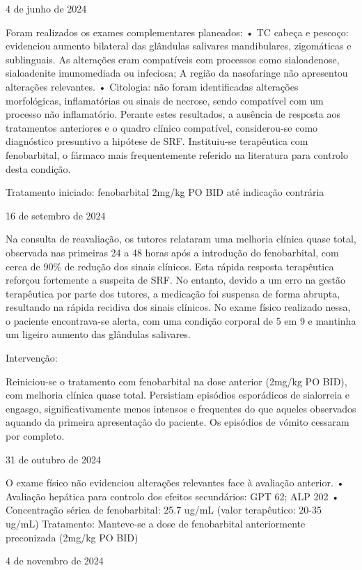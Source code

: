 4 de junho de 2024


Foram realizados os exames complementares planeados:
•	TC cabeça e pescoço: evidenciou aumento bilateral das glândulas salivares mandibulares, zigomáticas e sublinguais. As alterações eram compatíveis com processos como sialoadenose, sialoadenite imunomediada ou infeciosa; A região da nasofaringe não apresentou alterações relevantes.
•	Citologia: não foram identificadas alterações morfológicas, inflamatórias ou sinais de necrose, sendo compatível com um processo não inflamatório.
Perante estes resultados, a ausência de resposta aos tratamentos anteriores e o quadro clínico compatível, considerou-se como diagnóstico presuntivo a hipótese de SRF. Instituiu-se terapêutica com fenobarbital, o fármaco mais frequentemente referido na literatura para controlo desta condição.


Tratamento iniciado: fenobarbital 2mg/kg PO BID até indicação contrária


16 de setembro de 2024


Na consulta de reavaliação, os tutores relataram uma melhoria clínica quase total, observada nas primeiras 24 a 48 horas após a introdução do fenobarbital, com cerca de 90\% de redução dos sinais clínicos. Esta rápida resposta terapêutica reforçou fortemente a suspeita de SRF. No entanto, devido a um erro na gestão terapêutica por parte dos tutores, a medicação foi suspensa de forma abrupta, resultando na rápida recidiva dos sinais clínicos.
No exame físico realizado nessa, o paciente encontrava-se alerta, com uma condição corporal de 5 em 9 e mantinha um ligeiro aumento das glândulas salivares.


Intervenção:


Reiniciou-se o tratamento com fenobarbital na dose anterior (2mg/kg PO BID), com melhoria clínica quase total. Persistiam episódios esporádicos de sialorreia e engasgo, significativamente menos intensos e frequentes do que aqueles observados aquando da primeira apresentação do paciente. Os episódios de vómito cessaram por completo.


31 de outubro de 2024


O exame físico não evidenciou alterações relevantes face à avaliação anterior. 
•	Avaliação hepática para controlo dos efeitos secundários: GPT 62; ALP 202
•	Concentração sérica de fenobarbital: 25.7 ug/mL (valor terapêutico: 20-35 ug/mL)
Tratamento: Manteve-se a dose de fenobarbital anteriormente preconizada (2mg/kg PO BID)


4 de novembro de 2024


